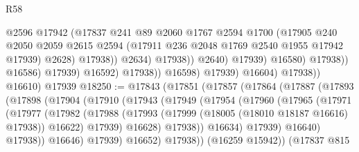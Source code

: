 \begin{lexlean}{R58}
\begin{coremodule}
                                            @2596
                                            @17942
                                            (@17837
                                              @241
                                              @89
                                              @2060
                                              @1767
                                              @2594
                                              @1700
                                              (@17905
                                                @240
                                                @2050
                                                @2059
                                                @2615
                                                @2594
                                                (@17911 @236 @2048 @1769 @2540 @1955 @17942 @17939)
                                                @2628)
                                              @17938))
                                          @2634)
                                        @17938))
                                    @2640)
                                  @17939)
                                @16580)
                              @17938))
                          @16586)
                        @17939)
                      @16592)
                    @17938))
                @16598)
              @17939)
            @16604)
          @17938))
      @16610)
    @17939
@18250 := @17843
    (@17851
      (@17857
        (@17864
          (@17887
            (@17893
              (@17898
                (@17904
                  (@17910
                    (@17943
                      (@17949
                        (@17954
                          (@17960
                            (@17965
                              (@17971
                                (@17977
                                  (@17982
                                    (@17988
                                      (@17993
                                        (@17999 (@18005 (@18010 @18187 @16616) @17938))
                                        @16622)
                                      @17939)
                                    @16628)
                                  @17938))
                              @16634)
                            @17939)
                          @16640)
                        @17938))
                    @16646)
                  @17939)
                @16652)
              @17938))
          (@16259 @15942))
        (@17837
          @815

\end{coremodule}
\end{lexlean}
